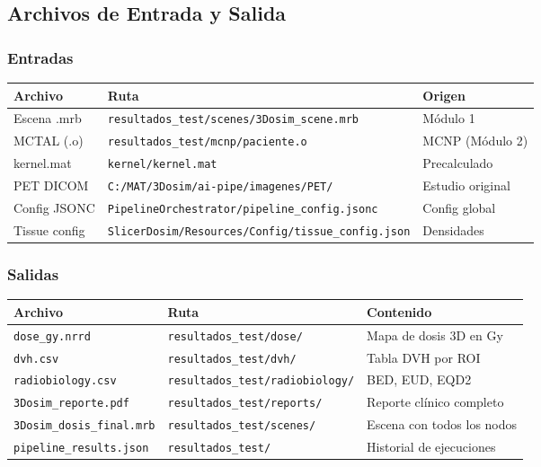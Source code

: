 \documentclass[12pt,a4paper]{article}
\begin{document}
\subsection{Archivos de Entrada y Salida}

\subsubsection{Entradas}

\begin{tabular}{p{4cm} p{5cm} p{4cm}}
\toprule
\textbf{Archivo} & \textbf{Ruta} & \textbf{Origen} \\
\midrule
Escena .mrb & \texttt{resultados\_test/scenes/3Dosim\_scene.mrb} & Módulo 1 \\
MCTAL (.o) & \texttt{resultados\_test/mcnp/paciente.o} & MCNP (Módulo 2) \\
kernel.mat & \texttt{kernel/kernel.mat} & Precalculado \\
PET DICOM & \texttt{C:/MAT/3Dosim/ai-pipe/imagenes/PET/} & Estudio original \\
Config JSONC & \texttt{PipelineOrchestrator/pipeline\_config.jsonc} & Config global \\
Tissue config & \texttt{SlicerDosim/Resources/Config/tissue\_config.json} & Densidades \\
\bottomrule
\end{tabular}

\subsubsection{Salidas}

\begin{tabular}{p{4cm} p{4cm} p{6cm}}
\toprule
\textbf{Archivo} & \textbf{Ruta} & \textbf{Contenido} \\
\midrule
\texttt{dose\_gy.nrrd} & \texttt{resultados\_test/dose/} & Mapa de dosis 3D en Gy \\
\texttt{dvh.csv} & \texttt{resultados\_test/dvh/} & Tabla DVH por ROI \\
\texttt{radiobiology.csv} & \texttt{resultados\_test/radiobiology/} & BED, EUD, EQD2 \\
\texttt{3Dosim\_reporte.pdf} & \texttt{resultados\_test/reports/} & Reporte clínico completo \\
\texttt{3Dosim\_dosis\_final.mrb} & \texttt{resultados\_test/scenes/} & Escena con todos los nodos \\
\texttt{pipeline\_results.json} & \texttt{resultados\_test/} & Historial de ejecuciones \\
\bottomrule
\end{tabular}
\end{document}
